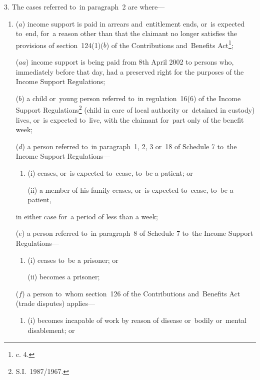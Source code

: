\documentclass[12pt,a4paper]{article}
\begin{document}
3.  The cases referred to~in paragraph~2 are where—
\begin{enumerate}\item[]
($a$) income support is paid in arrears and~entitlement ends, or~is expected to~end, for~a reason other than that the claimant no longer satisfies the provisions of section~124(1)($b$)  of the Contributions and~Benefits Act\footnote{ c. 4.};

($aa$) income support is being paid from 8th April 2002 to persons who, immediately before that day, had a preserved right for the purposes of the Income Support Regulations;

($b$) a child or~young person referred to~in regulation~16(6) of the Income Support Regulations\footnote{\frenchspacing S.I.~1987/1967.} (child in care of local authority or~detained in custody) lives, or~is expected to~live, with the claimant for~part only of the benefit week;


($d$) a person referred to~in paragraph~1, 2, 3 or~18 of Schedule 7 to~the Income Support Regulations—
\begin{enumerate}\item[]
(i) ceases, or~is expected to~cease, to~be a patient; or

(ii) a member of his family ceases, or~is expected to~cease, to~be a patient,
\end{enumerate}
in either case for~a period of less than a week;

($e$) a person referred to~in paragraph~8 of Schedule 7 to~the Income Support Regulations—
\begin{enumerate}\item[]
(i) ceases to~be a prisoner; or

(ii) becomes a prisoner;
\end{enumerate}

($f$) a person to~whom section~126 of the Contributions and~Benefits Act (trade disputes) applies—
\begin{enumerate}\item[]
(i) becomes incapable of work by reason of disease or~bodily or~mental disablement; or


\end{enumerate}
\end{enumerate}
\end{document}
